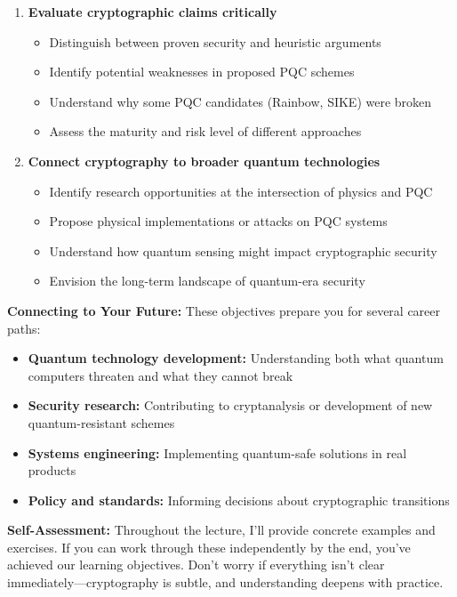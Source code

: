 \documentclass[11pt,a4paper]{article}
\begin{document}
\begin{enumerate}
    \item \textbf{Evaluate cryptographic claims critically}
    \begin{itemize}
        \item Distinguish between proven security and heuristic arguments
        \item Identify potential weaknesses in proposed PQC schemes
        \item Understand why some PQC candidates (Rainbow, SIKE) were broken
        \item Assess the maturity and risk level of different approaches
    \end{itemize}
    
    \item \textbf{Connect cryptography to broader quantum technologies}
    \begin{itemize}
        \item Identify research opportunities at the intersection of physics and PQC
        \item Propose physical implementations or attacks on PQC systems
        \item Understand how quantum sensing might impact cryptographic security
        \item Envision the long-term landscape of quantum-era security
    \end{itemize}
\end{enumerate}

\textbf{Connecting to Your Future:} These objectives prepare you for several career paths:
\begin{itemize}
    \item \textbf{Quantum technology development:} Understanding both what quantum computers threaten and what they cannot break
    \item \textbf{Security research:} Contributing to cryptanalysis or development of new quantum-resistant schemes
    \item \textbf{Systems engineering:} Implementing quantum-safe solutions in real products
    \item \textbf{Policy and standards:} Informing decisions about cryptographic transitions
\end{itemize}

\textbf{Self-Assessment:} Throughout the lecture, I'll provide concrete examples and exercises. If you can work through these independently by the end, you've achieved our learning objectives. Don't worry if everything isn't clear immediately---cryptography is subtle, and understanding deepens with practice.
\end{document}
